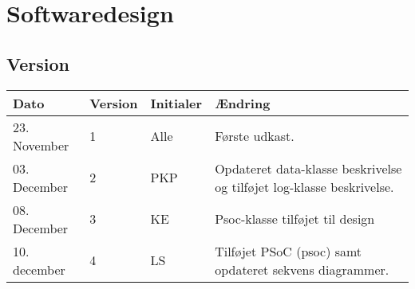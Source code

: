 \chapter{Softwaredesign}

\section*{Version}
\begin{table}[h]
	\centering
	\begin{tabularx}{\textwidth - 2cm}{|l|l|l|X|}
	\hline
	Dato			& Version		& Initialer 	& Ændring																	\\ \hline
	23. November	& 1 			& Alle			& Første udkast. 															\\ \hline
	03. December 	& 2 			& PKP			& Opdateret data-klasse beskrivelse og tilføjet log-klasse beskrivelse. 	\\ \hline
	08. December 	& 3 			& KE			& Psoc-klasse tilføjet til design 											\\ \hline
	10. december 	& 4 			& LS			& Tilføjet PSoC (psoc) samt opdateret sekvens diagrammer.					\\ \hline
\end{tabularx}
\end{table}
\clearpage






